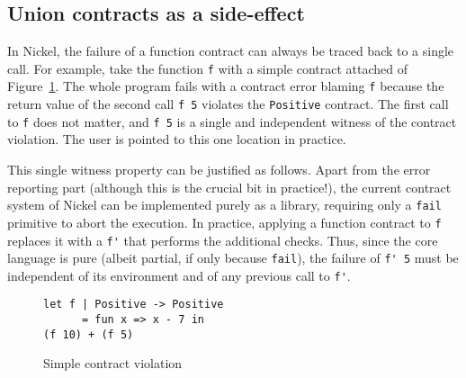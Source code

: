 \documentclass[sigplan,10pt,review,anonymous]{acmart}
\newcommand{\nickel}[1]{\lstinline[language=nickel]{#1}}
\begin{document}
\subsection{Union contracts as a side-effect}

In Nickel, the failure of a function contract can always be traced back to a
single call. For example, take the function \nickel{f} with a simple contract
attached of Figure~\ref{fig:pos-to-pos}. The whole program fails with a contract
error blaming \nickel{f} because the return value of the second call \nickel{f 5}
violates the \nickel{Positive} contract. The first call to \nickel{f} does
not matter, and \nickel{f 5} is a single and independent witness of the contract
violation. The user is pointed to this one location in practice.

This single witness property can be justified as follows. Apart from the error
reporting part (although this is the crucial bit in practice!), the current
contract system of Nickel can be implemented purely as a library, requiring only
a \nickel{fail} primitive to abort the execution. In practice, applying a
function contract to \nickel{f} replaces it with a \nickel{f'} that performs the
additional checks. Thus, since the core language is pure (albeit
partial, if only because \nickel{fail}), the failure of \nickel{f' 5}
must be independent of its environment and of any previous call to \nickel{f'}.

%

\begin{figure}[h]
\begin{lstlisting}[language=nickel]
let f | Positive -> Positive
      = fun x => x - 7 in
(f 10) + (f 5)
\end{lstlisting}
\caption{Simple contract violation}
\label{fig:pos-to-pos}
\end{figure}
\end{document}
